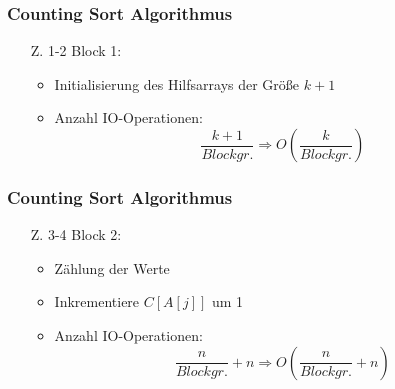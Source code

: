\documentclass{beamer}
\begin{document}
\begin{frame}
  \frametitle{Counting Sort Algorithmus}

  \begin{itemize}
    \item[Z. 1-2] Block 1:
    \begin{itemize}
      \item Initialisierung des Hilfsarrays der Größe $k+1$
      \item Anzahl IO-Operationen:
            \[
              \frac{k+1}{Blockgr.} \Rightarrow O(\frac{k}{Blockgr.})
            \]
    \end{itemize}
  \end{itemize}
  \vspace{1cm}
  \begin{figure}
    \flushright
  \end{figure}
\end{frame}

\begin{frame}
  \frametitle{Counting Sort Algorithmus}
  \begin{itemize}
    \item[Z. 3-4] Block 2:
    \begin{itemize}
      \item Zählung der Werte
      \item Inkrementiere $C[A[j]]$ um 1
      \item Anzahl IO-Operationen:
            \[
              \frac{n}{Blockgr.} + n \Rightarrow O(\frac{n}{Blockgr.} + n)
            \]
    \end{itemize}
  \end{itemize}
  \vspace{1cm}
  \begin{figure}
    \flushright
  \end{figure}
\end{frame}
\end{document}
